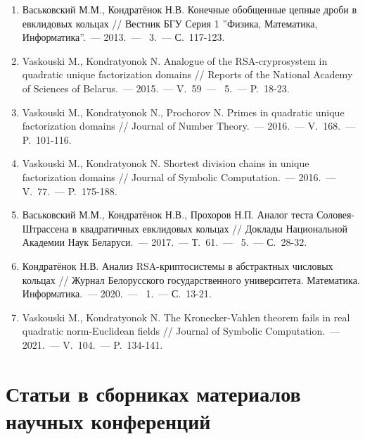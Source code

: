 \documentclass[_00_dissertation.tex]{subfiles}
\begin{document}
\begin{enumerate}

    \item \label{source:Vestnik_BSU_2013}
    Васьковский М.М., Кондратёнок Н.В. Конечные обобщенные цепные дроби в евклидовых кольцах // Вестник БГУ Серия 1 ''Физика, Математика, Информатика''.~--- 2013.~--- \textnumero~3.~--- С.~117-123.

    \item \label{source:NANB_2015}
    Vaskouski M., Kondratyonok N. Analogue of the RSA-cryprosystem in quadratic unique factorization domains // Reports of the National Academy of Sciences of Belarus.~--- 2015.~--- V.~59~--- \textnumero~5.~--- P.~18-23.

    \item \label{source:JNT_2016}
    Vaskouski M., Kondratyonok N., Prochorov N. Primes in quadratic unique factorization domains // Journal of Number Theory.~--- 2016.~--- V.~168.~--- P.~101-116.

    \item \label{source:JSC_2016}
    Vaskouski M., Kondratyonok N. Shortest division chains in unique factorization domains // Journal of Symbolic Computation.~--- 2016.~--- V.~77.~--- P.~175-188.

    \item \label{source:NANB_2017}
    Васьковский М.М., Кондратёнок Н.В., Прохоров Н.П. Аналог теста Соловея-Штрассена в квадратичных евклидовых кольцах // Доклады Национальной Академии Наук Беларуси.~--- 2017.~--- Т.~61.~--- \textnumero~5.~--- С.~28-32.

    \item \label{source:BSU_Journal_2020}
    Кондратёнок Н.В. Анализ RSA-криптосистемы в абстрактных числовых кольцах // Журнал Белорусского государственного университета. Математика. Информатика.~--- 2020.~--- \textnumero~1.~--- С.~13-21.

    \item \label{source:JSC_2021}
    Vaskouski M., Kondratyonok N. The Kronecker-Vahlen theorem fails in real quadratic norm-Euclidean fields // Journal of Symbolic Computation.~--- 2021.~--- V.~104.~--- P.~134-141.
\end{enumerate}

\vspace{-4ex}
\section*{\fontsize{14}{15}\selectfont Статьи в сборниках материалов научных конференций}
\vspace{-4ex}
\end{document}
